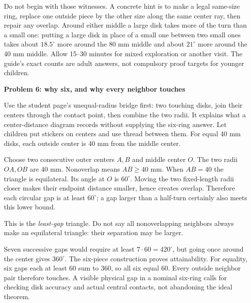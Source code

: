 \documentclass[11pt]{article}
\newcommand{\heading}[1]{\par\textbf{#1}\par}
\begin{document}
Do not begin with those witnesses. A concrete hint is to make a legal same-size ring, replace one outside piece by the other size along the same center ray, then repair any overlap. Around either middle a large disk takes more of the turn than a small one: putting a large disk in place of a small one between two small ones takes about $18.5^\circ$ more around the 80 mm middle and about $21^\circ$ more around the 40 mm middle. Allow 15--30 minutes for mixed exploration or another visit. The guide's exact counts are adult answers, not compulsory proof targets for younger children.
\newpage
\heading{Problem 6: why six, and why every neighbor touches}
Use the student page's unequal-radius bridge first: two touching disks, join their centers through the contact point, then combine the two radii. It explains what a center-distance diagram records without supplying the six-ring answer. Let children put stickers on centers and use thread between them. For equal 40 mm disks, each outside center is 40 mm from the middle center.

Choose two consecutive outer centers $A,B$ and middle center $O$. The two radii $OA,OB$ are 40 mm. Nonoverlap means $AB\ge 40$ mm. When $AB=40$ the triangle is equilateral. Its angle at $O$ is $60^\circ$. Moving the two fixed-length radii closer makes their endpoint distance smaller, hence creates overlap. Therefore each circular gap is at least $60^\circ$; a gap larger than a half-turn certainly also meets this lower bound.

\begin{center}\end{center}
This is the \emph{least-gap} triangle. Do not say all nonoverlapping neighbors always make an equilateral triangle: their separation may be larger.

Seven successive gaps would require at least $7\cdot 60=420^\circ$, but going once around the center gives $360^\circ$. The six-piece construction proves attainability. For equality, six gaps each at least 60 sum to 360, so all six equal 60. Every outside neighbor pair therefore touches. A visible physical gap in a nominal six-ring calls for checking disk accuracy and actual central contacts, not abandoning the ideal theorem.
\end{document}
